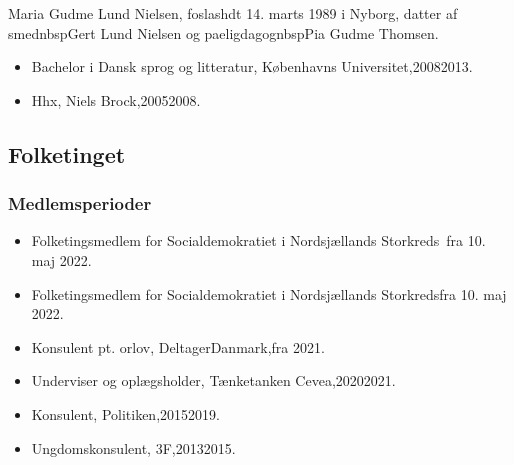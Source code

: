 \documentclass[11pt, a4paper]{awesome-cv}
\begin{document}
\makecvheader[R]
\makelettertitle
\begin{cvletter}
Maria Gudme Lund Nielsen, foslashdt 14. marts 1989 i Nyborg, datter af smednbspGert Lund Nielsen og paeligdagognbspPia Gudme Thomsen.

\begin{itemize}
\item Bachelor i Dansk sprog og litteratur, Københavns Universitet,20082013.
\item Hhx, Niels Brock,20052008.
\end{itemize}
\subsection*{Folketinget}
\subsubsection*{Medlemsperioder}
\begin{itemize}
\item Folketingsmedlem for Socialdemokratiet i Nordsjællands Storkreds fra 10. maj 2022.
\item Folketingsmedlem for Socialdemokratiet i Nordsjællands Storkredsfra 10. maj 2022.
\end{itemize}
\begin{itemize}
\item Konsulent pt. orlov, DeltagerDanmark,fra 2021.
\item Underviser og oplægsholder, Tænketanken Cevea,20202021.
\item Konsulent, Politiken,20152019.
\item Ungdomskonsulent, 3F,20132015.
\end{itemize}
\end{cvletter}
\end{document}
